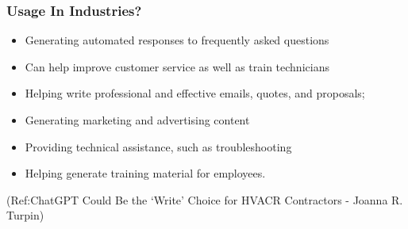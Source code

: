 


\begin{frame}[fragile]\frametitle{Usage In Industries?}


\begin{itemize}
\item Generating automated responses to frequently asked questions 
\item Can help improve customer service as well as
train technicians
\item Helping write professional and effective emails, quotes, and proposals;
\item Generating marketing and advertising content
\item Providing technical assistance, such as troubleshooting
\item Helping generate training material for employees.
\end{itemize}	 

\tiny{(Ref:ChatGPT Could Be the ‘Write’ Choice for HVACR Contractors - Joanna R. Turpin)}
\end{frame}




